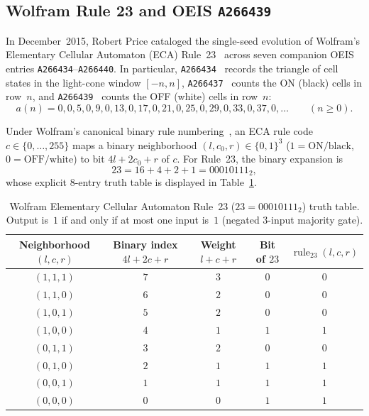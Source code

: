 \documentclass[11pt]{article}
\theoremstyle{definition}
\newcommand{\seq}[1]{\texttt{#1}}
\newcommand{\ruleTT}{\operatorname{rule}_{23}}
\begin{document}
\subsection{Wolfram Rule 23 and OEIS \texorpdfstring{\seq{A266439}}{A266439}}

In December~2015, Robert Price cataloged the single-seed evolution of Wolfram's Elementary Cellular Automaton (ECA) Rule~23~\cite{wolfram2002,mathworldECA} across seven companion OEIS entries \seq{A266434}--\seq{A266440}. In particular, \seq{A266434}~\cite{oeis266434} records the triangle of cell states in the light-cone window $[-n, n]$, \seq{A266437}~\cite{oeis266437} counts the ON (black) cells in row~$n$, and \seq{A266439}~\cite{oeis266439} counts the OFF (white) cells in row~$n$:
\[
a(n) = 0, 0, 5, 0, 9, 0, 13, 0, 17, 0, 21, 0, 25, 0, 29, 0, 33, 0, 37, 0, \dots \qquad (n \ge 0).
\]

Under Wolfram's canonical binary rule numbering~\cite{wolfram2002}, an ECA rule code $c \in \{0, \dots, 255\}$ maps a binary neighborhood $(l, c_0, r) \in \{0, 1\}^3$ ($1 = \text{ON/black}$, $0 = \text{OFF/white}$) to bit $4l + 2c_0 + r$ of $c$. For Rule~23, the binary expansion is
\[
23 = 16 + 4 + 2 + 1 = 00010111_2,
\]
whose explicit $8$-entry truth table is displayed in Table~\ref{tab:rule23-tt}.

\begin{table}[ht]
\centering
\caption{Wolfram Elementary Cellular Automaton Rule~23 ($23 = 00010111_2$) truth table. Output is~$1$ if and only if at most one input is~$1$ (negated $3$-input majority gate).}
\label{tab:rule23-tt}
\smallskip
{\small
\begin{tabular}{@{}c c c c c@{}}
\toprule
Neighborhood $(l, c, r)$ & Binary index $4l + 2c + r$ & Weight $l + c + r$ & Bit of $23$ & $\ruleTT(l, c, r)$ \\
\midrule
$(1, 1, 1)$ & $7$ & $3$ & $0$ & $0$ \\
$(1, 1, 0)$ & $6$ & $2$ & $0$ & $0$ \\
$(1, 0, 1)$ & $5$ & $2$ & $0$ & $0$ \\
$(1, 0, 0)$ & $4$ & $1$ & $1$ & $1$ \\
$(0, 1, 1)$ & $3$ & $2$ & $0$ & $0$ \\
$(0, 1, 0)$ & $2$ & $1$ & $1$ & $1$ \\
$(0, 0, 1)$ & $1$ & $1$ & $1$ & $1$ \\
$(0, 0, 0)$ & $0$ & $0$ & $1$ & $1$ \\
\bottomrule
\end{tabular}
}
\end{table}
\end{document}
